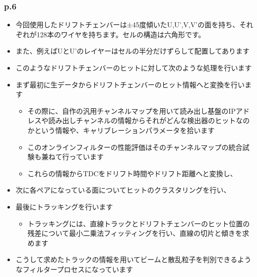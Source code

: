 \documentclass[12pt,a4paper,upLaTeX]{jsarticle}
\begin{document}
\subsubsection*{p.6}
\begin{itemize}
\item 今回使用したドリフトチェンバーは±45度傾いたU,U’,V,V'の面を持ち、それぞれが128本のワイヤを持ちます。セルの構造は六角形です。
\item また、例えばUとU'のレイヤーはセルの半分だけずらして配置してあります
\item このようなドリフトチェンバーのヒットに対して次のような処理を行います
\item まず最初に生データからドリフトチェンバーのヒット情報へと変換を行います
\begin{itemize}
\item その際に、自作の汎用チャンネルマップを用いて読み出し基盤のIPアドレスや読み出しチャンネルの情報からそれがどんな検出器のヒットなのかという情報や、キャリブレーションパラメータを拾います
\item このオンラインフィルターの性能評価はそのチャンネルマップの統合試験も兼ねて行っています
\item これらの情報からTDCをドリフト時間やドリフト距離へと変換し、
\end{itemize}
\item 次に各ペアになっている面についてヒットのクラスタリングを行い、
\item 最後にトラッキングを行います
\begin{itemize}
\item トラッキングには、直線トラックとドリフトチェンバーのヒット位置の残差について最小二乗法フィッティングを行い、直線の切片と傾きを求めます
\end{itemize}
\item こうして求めたトラックの情報を用いてビームと散乱粒子を判別できるようなフィルタープロセスになっています
\end{itemize}
\end{document}
